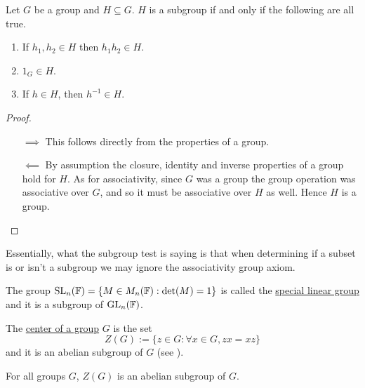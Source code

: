 \documentclass[11pt]{article}
\begin{document}
\begin{theorem}
    Let $G$ be a group and $H\subseteq G$. $H$ is a subgroup if and only if the following are all true.
    \begin{enumerate}
        \item If $h_1,h_2\in H$ then $h_1h_2\in H$.
        \item $1_G\in H$.
        \item If $h\in H$, then $h^{-1}\in H$.
    \end{enumerate}
\end{theorem}

\begin{proof}\,
    \begin{itemize}
        \item[$\implies$] This follows directly from the properties of a group.
        \item[$\impliedby$] By assumption the closure, identity and inverse properties of a group hold for $H$. As for associativity, since $G$ was a group the group operation was associative over $G$, and so it must be associative over $H$ as well. Hence $H$ is a group.
    \end{itemize}
\end{proof}

\begin{remark}
    Essentially, what the subgroup test is saying is that when determining if a subset is or isn't a subgroup we may ignore the associativity group axiom.
\end{remark}

\begin{definition}
    The group $\operatorname{SL}_n(\mathbb{F})=\{M\in M_n(\mathbb{F}):\det(M)=1\}$ is called the \ul{special linear group} and it is a subgroup of $\operatorname{GL}_n(\mathbb{F})$.
\end{definition}

\begin{definition}
    The \ul{center of a group} $G$ is the set
    \[Z(G):=\{z\in G:\forall x\in G,zx=xz\}\]
    and it is an abelian subgroup of $G$ (see ).
\end{definition}

\begin{proposition}
    For all groups $G$, $Z(G)$ is an abelian subgroup of $G$.
\end{proposition}
\end{document}
